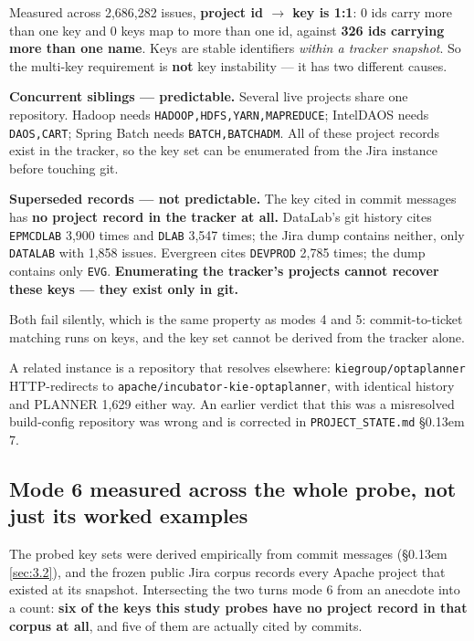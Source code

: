 \documentclass[conference]{IEEEtran}
\begin{document}
Measured across 2,686,282 issues, \textbf{project id $\rightarrow$ key is 1:1}: 0 ids carry more than one key and 0 keys map to more than one id, against \textbf{326 ids carrying more than one name}. Keys are stable identifiers \emph{within a tracker snapshot}. So the multi-key requirement is \textbf{not} key instability --- it has two different causes.

\textbf{Concurrent siblings --- predictable.} Several live projects share one repository. Hadoop needs \texttt{HADOOP,HDFS,YARN,MAPREDUCE}; IntelDAOS needs \texttt{DAOS,CART}; Spring Batch needs \texttt{BATCH,BATCHADM}. All of these project records exist in the tracker, so the key set can be enumerated from the Jira instance before touching git.

\textbf{Superseded records --- not predictable.} The key cited in commit messages has \textbf{no project record in the tracker at all.} DataLab's git history cites \texttt{EPMCDLAB} 3,900 times and \texttt{DLAB} 3,547 times; the Jira dump contains neither, only \texttt{DATALAB} with 1,858 issues. Evergreen cites \texttt{DEVPROD} 2,785 times; the dump contains only \texttt{EVG}. \textbf{Enumerating the tracker's projects cannot recover these keys --- they exist only in git.}

Both fail silently, which is the same property as modes 4 and 5: commit-to-ticket matching runs on keys, and the key set cannot be derived from the tracker alone.

A related instance is a repository that resolves elsewhere: \texttt{kiegroup/\allowbreak{}optaplanner} HTTP-redirects to \texttt{apache/\allowbreak{}incubator-\allowbreak{}kie-\allowbreak{}optaplanner}, with identical history and PLANNER 1,629 either way. An earlier verdict that this was a misresolved build-config repository was wrong and is corrected in \texttt{PROJECT\_\allowbreak{}STATE.\allowbreak{}md} \S\kern0.13em 7.

\subsection{Mode 6 measured across the whole probe, not just its worked examples}
\label{sec:5.3}

The probed key sets were derived empirically from commit messages (\S\kern0.13em \ref{sec:3.2}), and the frozen public Jira corpus records every Apache project that existed at its snapshot. Intersecting the two turns mode 6 from an anecdote into a count: \textbf{\textbf{six} of the keys this study probes have no project record in that corpus at all}, and five of them are actually cited by commits.
\end{document}
